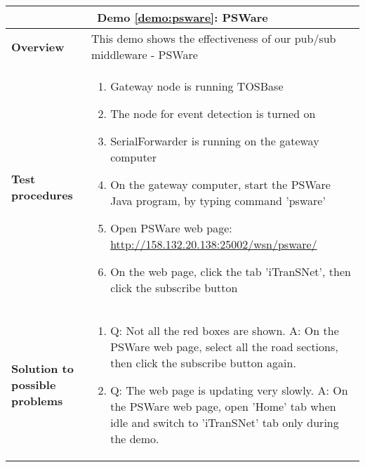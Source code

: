 \begin{center}
	\begin{tabular}{ | p{2cm} | p{10cm} | }
		\hline
		\multicolumn{2}{|c|}{\textbf{Demo \ref{demo:psware}: PSWare}} \\ \hline
		\textbf{Overview} &  This demo shows the effectiveness of our pub/sub middleware - PSWare \\ \hline
		\textbf{Test procedures} &
		\begin{enumerate}
		\item Gateway node is running TOSBase
		\item The node for event detection is turned on
		\item SerialForwarder is running on the gateway computer
		\item On the gateway computer, start the PSWare Java program, by typing command 'psware'
		\item Open PSWare web page: \url{http://158.132.20.138:25002/wsn/psware/}
		\item On the web page, click the tab 'iTranSNet', then click the subscribe button
		\end{enumerate} \\ \hline
		\textbf{Solution to possible problems} &
		\begin{enumerate}
		\item Q: Not all the red boxes are shown. A: On the PSWare web page, select all the road sections, then click the subscribe button again.
		\item Q: The web page is updating very slowly. A: On the PSWare web page, open 'Home' tab when idle and switch to 'iTranSNet' tab only during the demo.
		\end{enumerate}  \\
		\hline
	\end{tabular}
\end{center}

